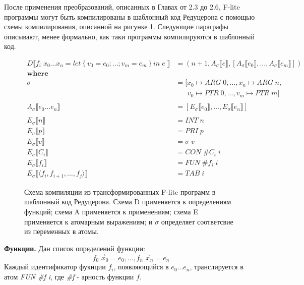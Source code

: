 \documentclass[flenqn, 14pt]{extarticle}
\begin{document}
После применения преобразований, описанных в Главах от 2.3 до 2.6, F-lite программы могут быть компилированы в шаблонный код Редуцерона с помощью схемы компилирования, описанной на рисунке \ref{fig:compilation_sheme}. Следующие параграфы описывают, менее формально, как таки программы компилируются в шаблонный код.

\begin{figure}[t]
\begin{align*}
D \llbracket f_i \; x_0 \ldots x_n = let \left\lbrace v_0 = e_0; \ldots; v_m = e_m \right\rbrace in \; e \; \rrbracket &= \left( n+1, A_\sigma \llbracket e \rrbracket, \left[ A_\sigma \llbracket e_0 \rrbracket, \ldots, A_\sigma \llbracket e_m \rrbracket \right] \right) \\
\textbf{where} \; & & \\
\sigma &= [x_0 \mapsto \textit{ARG} \; 0, \ldots, x_n \mapsto \textit{ARG} \; n, \\
       &\;\;\;\;\;\;  v_0 \mapsto \textit{PTR} \; 0, \ldots, v_m \mapsto \textit{PTR} \; m] \\
\\
A_\sigma \llbracket e_0 \ldots e_n \rrbracket &= [E_\sigma \llbracket e_0 \rrbracket, \ldots, E_\sigma \llbracket e_n \rrbracket ] \\
\\
E_\sigma \llbracket n \rrbracket &= \textit{INT} \; n \\
E_\sigma \llbracket p \rrbracket &= \textit{PRI} \; p \\
E_\sigma \llbracket v \rrbracket &= \sigma \; v \\
E_\sigma \llbracket C_i \rrbracket &= \textit{CON} \; \#C_i \; i \\
E_\sigma \llbracket f_i \rrbracket &= \textit{FUN} \; \#f_i \; i \\
E_\sigma \llbracket \langle f_i, f_{i+1}, \ldots, f_j \rangle \rrbracket &= \textit{TAB} \; i
\end{align*} 
\label{fig:compilation_sheme}
\caption{Схема компиляции из трансформированных F-lite программ в шаблонный код Редуцерона. Схема D применяется к определениям функций; схема A применяется к применениям; схема E применяется к атомарным выражениям; и $\sigma$ определяет соответсвие из переменных в атомы.}
\end{figure}

\textbf{Функции.} Дан список определений функции:
$$
f_0 \; \vec{x}_0 = e_0, \ldots, f_n \; \vec{x}_n = e_n
$$
Каждый идентификатор фукнции $f_i$, появляющийся в $e_0 \ldots e_n$, транслируется в атом \textit{FUN \#f i}, где \textit{\#f} - арность функции $f$.
\end{document}
